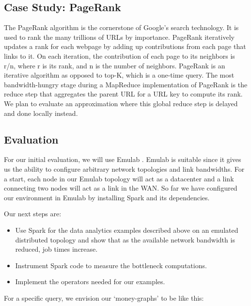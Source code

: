 \subsection{Case Study: PageRank}

The PageRank algorithm is the cornerstone of Google’s search technology. It is used to rank the many trillions of URLs by importance. PageRank iteratively updates a rank for each webpage by adding up contributions from each page that links to it. On each iteration, the contribution of each page to its neighbors is r/n, where r is its rank, and n is the number of neighbors.
PageRank is an iterative algorithm as opposed to top-K, which is a one-time query. The most bandwidth-hungry stage during a MapReduce implementation of PageRank is the reduce step that aggregates the parent URL for a URL key to compute its rank. We plan to evaluate an approximation where this global reduce step is delayed and done locally instead. 

\subsection{Evaluation}

For our initial evaluation, we will use Emulab \cite{2}. Emulab is suitable since it gives us the ability to configure arbitrary network topologies and link bandwidths. For a start, each node in our Emulab topology will act as a datacenter and a link connecting two nodes will act as a link in the WAN. So far we have configured our environment in Emulab by installing Spark and its dependencies.

Our next steps are:
\begin{itemize}
\item Use Spark for the data analytics examples described above on an emulated distributed topology and show that as the available network bandwidth is reduced, job times increase.
\item Instrument Spark code to measure the bottleneck computations.
\item Implement the operators needed for our examples.
\end{itemize}

For a specific query, we envision our ‘money-graphs’ to be like this:

